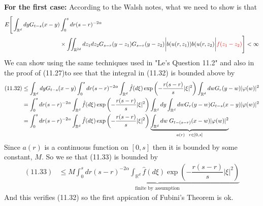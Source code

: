 \documentclass[a4paper,11pt]{article}
\theoremstyle{plain}
\theoremstyle{definition}
\newcommand{\R}{\mathbb{R}}
\numberwithin{NQ}{section}
\numberwithin{LQ}{section}
\numberwithin{ZQ}{section}
\begin{document}
\noindent \textbf{For the first case:} According to the Walsh notes, what we need to show is that 
\begin{align}
E \Bigg[\int_{\R^d}dyG_{t-s}(x-y)&\int_0^sdr(s-r)^{-2\alpha} \notag \\ &\times\iint_{\R^{2d}}dz_1dz_2  G_{s-r}(y-z_1)G_{s-r}(y-z_2)\bigg|b(u(r,z_1))b(u(r,z_2)\bigg|\textcolor{red}{f(z_1-z_2)} \Bigg] < \infty
\end{align}
We can show using the same techniques used in "Le's Question 11.2" and also in the proof of (11.27)to see that the integral in (11.32) is bounded above by
\begin{align}
    (11.32) &\le \int_{\R^d}dyG_{t-s}(x-y)\int_0^sdr(s-r)^{-2\alpha}\int_{\R^d}\hat f(d\xi)\exp\left(-\dfrac{r(s-r)}{s}|\xi|^2\right)\int_{\R^d}dwG_r(y-w)|\varphi(w)|^2 \notag
    \\&=\int_0^sdr(s-r)^{-2\alpha}\int_{\R^d}\hat f(d\xi)\exp\left(-\dfrac{r(s-r)}{s}|\xi|^2\right)\int_{\R^d}dy\int_{\R^d}dwG_r(y-w)G_{t-s}(x-y)|\varphi(w)|^2 \notag
    \\ &= \int_0^sdr(s-r)^{-2\alpha}\int_{\R^d}\hat f(d\xi)\exp\left(-\dfrac{r(s-r)}{s}|\xi|^2\right)\underbrace{\int_{\R^d}dw \;G_{t-(s-r)}(x-w)|\varphi(w)|^2}_{a(r) \;\;\; r\in[0,s]} 
\end{align}
Since $a(r)$ is a continuous function on $[0,s]$ then it is bounded by some constant, $M$. So we se that (11.33) is bounded by 
\begin{align}
    (11.33) &\le M \underbrace{\int_0^sdr(s-r)^{-2\alpha}\int_{\R^d}\hat f(d\xi)\exp\left(-\dfrac{r(s-r)}{s}|\xi|^2\right)}_{\text{finite by assumption}}
\end{align}
And this verifies (11.32) so the first appication of Fubini's Theorem is ok. \\
\end{document}

